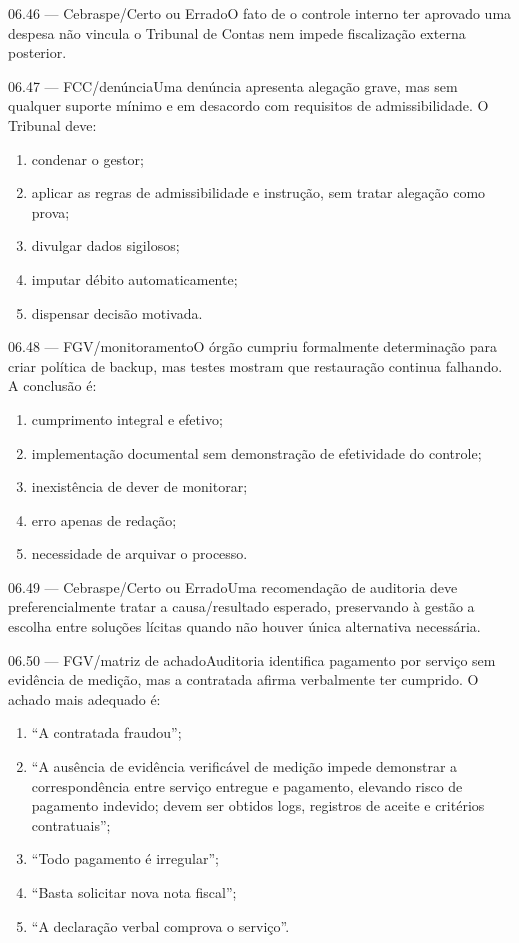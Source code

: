 \begin{questao}{ 06.46 — Cebraspe/Certo ou Errado}O fato de o controle interno ter aprovado uma despesa não vincula o Tribunal de Contas nem impede fiscalização externa posterior.\end{questao}
\begin{questao}{ 06.47 — FCC/denúncia}Uma denúncia apresenta alegação grave, mas sem qualquer suporte mínimo e em desacordo com requisitos de admissibilidade. O Tribunal deve:\begin{enumerate}[label=\Alph*)]\item condenar o gestor;\item aplicar as regras de admissibilidade e instrução, sem tratar alegação como prova;\item divulgar dados sigilosos;\item imputar débito automaticamente;\item dispensar decisão motivada.\end{enumerate}\end{questao}
\begin{questao}{ 06.48 — FGV/monitoramento}O órgão cumpriu formalmente determinação para criar política de backup, mas testes mostram que restauração continua falhando. A conclusão é:\begin{enumerate}[label=\Alph*)]\item cumprimento integral e efetivo;\item implementação documental sem demonstração de efetividade do controle;\item inexistência de dever de monitorar;\item erro apenas de redação;\item necessidade de arquivar o processo.\end{enumerate}\end{questao}
\begin{questao}{ 06.49 — Cebraspe/Certo ou Errado}Uma recomendação de auditoria deve preferencialmente tratar a causa/resultado esperado, preservando à gestão a escolha entre soluções lícitas quando não houver única alternativa necessária.\end{questao}
\begin{questao}{ 06.50 — FGV/matriz de achado}Auditoria identifica pagamento por serviço sem evidência de medição, mas a contratada afirma verbalmente ter cumprido. O achado mais adequado é:\begin{enumerate}[label=\Alph*)]\item ``A contratada fraudou'';\item ``A ausência de evidência verificável de medição impede demonstrar a correspondência entre serviço entregue e pagamento, elevando risco de pagamento indevido; devem ser obtidos logs, registros de aceite e critérios contratuais'';\item ``Todo pagamento é irregular'';\item ``Basta solicitar nova nota fiscal'';\item ``A declaração verbal comprova o serviço''.\end{enumerate}\end{questao}
